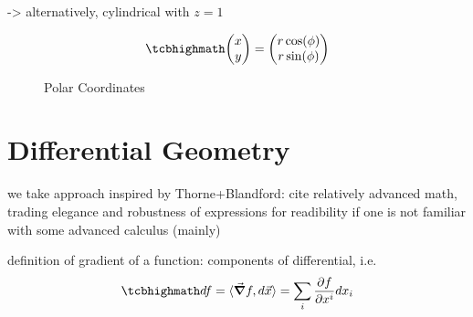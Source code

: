 \documentclass[../class_mech_main.tex]{subfiles}
\begin{document}
-> alternatively, cylindrical with $z = 1$


\begin{equation}\label{eq:polar_coords}
    \eqbox{
        \mqty(x \\ y) = \mqty(r \cos(\phi) \\ r \sin(\phi))
    }
\end{equation}



\begin{figure}
    \centering

    \hspace*{0.08\textwidth}%

    \caption{Polar Coordinates}
    \label{fig:polar_coordinates}
\end{figure}



    \section{Differential Geometry}

we take approach inspired by Thorne+Blandford: cite relatively advanced math, trading elegance and robustness of expressions for readibility if one is not familiar with some advanced calculus (mainly)


definition of gradient of a function: components of differential, i.e.
\begin{equation}
    \eqbox{
        df = \langle \grad f, d\vec{x} \rangle = \sum_i \pdv{f}{x^i} dx_i
    }
\end{equation}
\end{document}
